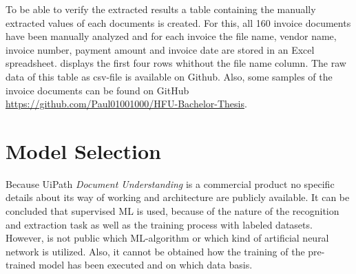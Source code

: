 To be able to verify the extracted results a table containing the manually extracted values of each documents is created.
For this, all 160 invoice documents have been manually analyzed and for each invoice the file name, vendor name, invoice number, payment amount and invoice date are stored in an Excel spreadsheet.  displays the first four rows whithout the file name column. The raw data of this table as csv-file is available on Github. Also, some samples of the invoice documents can be found on GitHub \url{https://github.com/Paul01001000/HFU-Bachelor-Thesis}. \\

\begin{table}[ht]
    \centering
    \caption{First 4 rows of data verification table}
    \label{tab:db}
\end{table}

\newpage
\section{Model Selection}
Because UiPath \textit{Document Understanding} is a commercial product no specific details about its way of working and architecture are publicly available. It can be concluded that supervised \acf{ML} is used, because of the nature of the recognition and extraction task as well as the training process with labeled datasets. However, is not public which \ac{ML}-algorithm or which kind of artificial neural network is utilized. Also, it cannot be obtained how the training of the pre-trained model has been executed and on which data basis.

